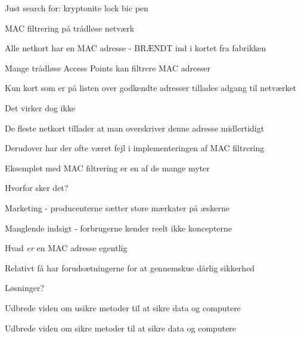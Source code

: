\documentclass[20pt,landscape,a4paper]{foils}
\begin{document}

\begin{list1}
\item Just search for: kryptonite lock bic pen
\item {}
\end{list1}




\begin{list1}
\item MAC filtrering på trådløse netværk
\item Alle netkort har en MAC adresse - BRÆNDT ind i kortet fra fabrikken
\item Mange trådløse Access Points kan filtrere MAC adresser
\item Kun kort som er på listen over godkendte adresser tillades adgang til netværket
\pause
\item Det virker dog ikke \smiley
\item De fleste netkort tillader at man overskriver denne adresse midlertidigt
\item Derudover har der ofte været fejl i implementeringen af MAC filtrering
\end{list1}


\begin{list1}
\item Eksemplet med MAC filtrering er en af de mange myter
\item Hvorfor sker det?
\item Marketing - producenterne sætter store mærkater på æskerne
\item Manglende indsigt - forbrugerne kender reelt ikke koncepterne
\item Hvad \emph{er} en MAC adresse egentlig
\item Relativt få har forudsætningerne for at gennemskue dårlig sikkerhed
\item Løsninger?
\pause
\item Udbrede viden om usikre metoder til at sikre data og computere
\item Udbrede viden om sikre metoder til at sikre data og computere
\end{list1}


\end{document}
